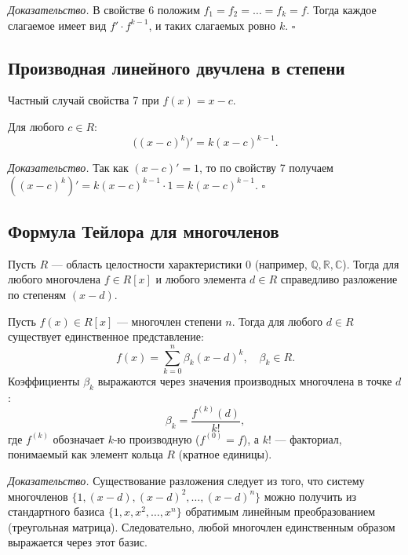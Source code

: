 \documentclass[a4paper,12pt]{article}
\theoremstyle{definition}
\theoremstyle{plain}
\theoremstyle{remark}
\begin{document}
	\medskip
	\textit{Доказательство.}
	В свойстве 6 положим \( f_1 = f_2 = \dots = f_k = f \). Тогда каждое слагаемое имеет вид \( f' \cdot f^{k-1} \), и таких слагаемых ровно \( k \). \hfill \(\square\)
	
	\subsection{Производная линейного двучлена в степени}
	
	Частный случай свойства 7 при \( f(x) = x - c \).
	
	\begin{tcolorbox}[colback=blue!5, colframe=blue!40!black, title=Свойство 8]
		Для любого \( c \in R \):
		\[
		\big((x - c)^k\big)' = k (x - c)^{k-1}.
		\]
	\end{tcolorbox}
	
	\medskip
	\textit{Доказательство.}
	Так как \( (x - c)' = 1 \), то по свойству 7 получаем \( ((x - c)^k)' = k (x - c)^{k-1} \cdot 1 = k (x - c)^{k-1} \). \hfill \(\square\)
	
	\subsection{Формула Тейлора для многочленов}
	
	Пусть \( R \) — область целостности характеристики 0 (например, \( \mathbb{Q}, \mathbb{R}, \mathbb{C} \)). Тогда для любого многочлена \( f \in R[x] \) и любого элемента \( d \in R \) справедливо разложение по степеням \( (x - d) \).
	
	\begin{tcolorbox}[colback=yellow!5, colframe=orange!50!black, title=Теорема (Формула Тейлора)]
		Пусть \( f(x) \in R[x] \) — многочлен степени \( n \). Тогда для любого \( d \in R \) существует единственное представление:
		\[
		f(x) = \sum_{k=0}^n \beta_k (x - d)^k, \quad \beta_k \in R.
		\]
		Коэффициенты \( \beta_k \) выражаются через значения производных многочлена в точке \( d \):
		\[
		\beta_k = \frac{f^{(k)}(d)}{k!},
		\]
		где \( f^{(k)} \) обозначает \( k \)-ю производную (\( f^{(0)} = f \)), а \( k! \) — факториал, понимаемый как элемент кольца \( R \) (кратное единицы).
	\end{tcolorbox}
	
	\medskip
	\textit{Доказательство.}
	Существование разложения следует из того, что систему многочленов \( \{1, (x-d), (x-d)^2, \dots, (x-d)^n\} \) можно получить из стандартного базиса \( \{1, x, x^2, \dots, x^n\} \) обратимым линейным преобразованием (треугольная матрица). Следовательно, любой многочлен единственным образом выражается через этот базис.
	
\end{document}
